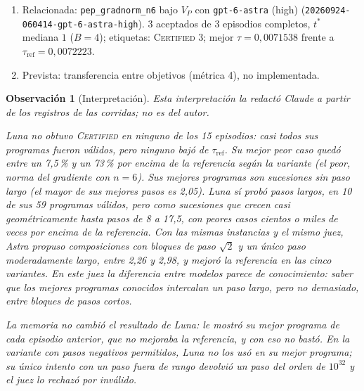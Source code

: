 \documentclass[11pt,a4paper]{article}
\newtheorem{remark}{Observación}
\begin{document}
{\begin{enumerate}
  \item Relacionada: \texttt{pep\_\allowbreak{}gradnorm\_\allowbreak{}n6} bajo $V_P$ con \texttt{gpt-\allowbreak{}6-\allowbreak{}astra} (high) (\texttt{20260924-\allowbreak{}060414-\allowbreak{}gpt-\allowbreak{}6-\allowbreak{}astra-\allowbreak{}high}). 3 aceptados de 3 episodios completos, $t^*$ mediana $1$ ($B = 4$); etiquetas: \textsc{Certified} 3; mejor $\tau = 0{,}0071538$ frente a $\tau_{\mathrm{ref}} = 0{,}0072223$.
  \item Prevista: transferencia entre objetivos (métrica 4), no implementada.
\end{enumerate}
\par}

\begin{remark}[Interpretación]
Esta interpretación la redactó Claude a partir de los registros de las corridas; no es del autor.

Luna no obtuvo \textsc{Certified} en ninguno de los 15 episodios: casi todos sus programas fueron válidos, pero ninguno bajó de $\tau_{\mathrm{ref}}$. Su mejor peor caso quedó entre un 7{,}5\,\% y un 73\,\% por encima de la referencia según la variante (el peor, norma del gradiente con $n = 6$). Sus mejores programas son sucesiones sin paso largo (el mayor de sus mejores pasos es 2{,}05). Luna sí probó pasos largos, en 10 de sus 59 programas válidos, pero como sucesiones que crecen casi geométricamente hasta pasos de 8 a 17{,}5, con peores casos cientos o miles de veces por encima de la referencia. Con las mismas instancias y el mismo juez, Astra propuso composiciones con bloques de paso $\sqrt{2}$ y un único paso moderadamente largo, entre 2{,}26 y 2{,}98, y mejoró la referencia en las cinco variantes. En este juez la diferencia entre modelos parece de conocimiento: saber que los mejores programas conocidos intercalan un paso largo, pero no demasiado, entre bloques de pasos cortos.

La memoria no cambió el resultado de Luna: le mostró su mejor programa de cada episodio anterior, que no mejoraba la referencia, y con eso no bastó. En la variante con pasos negativos permitidos, Luna no los usó en su mejor programa; su único intento con un paso fuera de rango devolvió un paso del orden de $10^{32}$ y el juez lo rechazó por inválido.
\end{remark}


\end{document}
